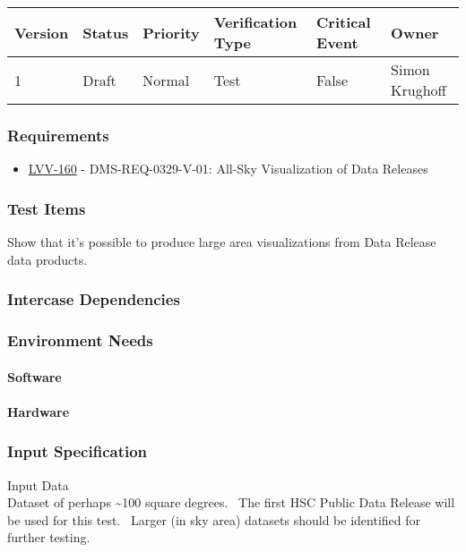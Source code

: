 \begin{longtable}[]{llllll}
\toprule
Version & Status & Priority & Verification Type & Critical Event & Owner
\\\midrule
1 & Draft & Normal &
Test & False & Simon Krughoff
\\\bottomrule
\end{longtable}

\subsubsection{Requirements}
\begin{itemize}
\item \href{https://jira.lsstcorp.org/browse/LVV-160}{LVV-160} - DMS-REQ-0329-V-01: All-Sky Visualization of Data Releases
\end{itemize}

\subsubsection{Test Items}
Show that it's possible to produce large area visualizations from Data
Release data products.



\subsubsection{Intercase Dependencies}

\subsubsection{Environment Needs}

\paragraph{Software}

\paragraph{Hardware}

\subsubsection{Input Specification}
Input Data\\
Dataset of perhaps \textasciitilde{}100 square degrees. ~The first HSC
Public Data Release will be used for this test. ~Larger (in sky area)
datasets should be identified for further testing.


